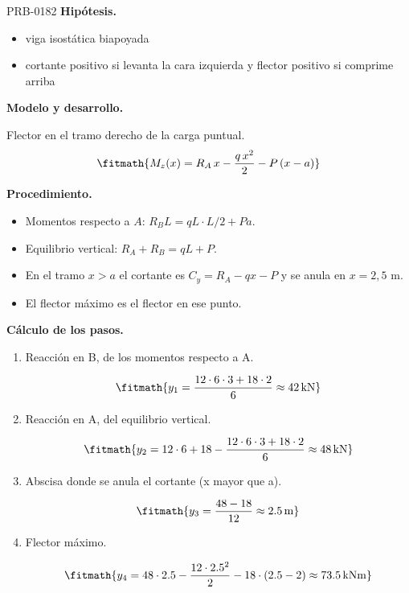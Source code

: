 \begin{studiumworked}{PRB-0182}
\textbf{Hipótesis.}\begin{itemize}\item viga isostática biapoyada
\item cortante positivo si levanta la cara izquierda y flector positivo si comprime arriba\end{itemize}

\textbf{Modelo y desarrollo.}

Flector en el tramo derecho de la carga puntual.\[\fitmath{M_z(x) = R_A\,x - \frac{q\,x^{2}}{2} - P\,(x - a)}\]

\textbf{Procedimiento.}\begin{itemize}\item Momentos respecto a $A$: $R_B L = qL\cdot L/2 + P a$.
\item Equilibrio vertical: $R_A + R_B = qL + P$.
\item En el tramo $x > a$ el cortante es $C_y = R_A - qx - P$ y se anula en $x = 2{,}5$ m.
\item El flector máximo es el flector en ese punto.\end{itemize}

\textbf{Cálculo de los pasos.}

\begin{enumerate}

\item Reacción en B, de los momentos respecto a A.

\[\fitmath{y_{1}=\frac{12\cdot 6\cdot 3+18\cdot 2}{6}\approx 42\,\mathrm{kN}}\]

\item Reacción en A, del equilibrio vertical.

\[\fitmath{y_{2}=12\cdot 6+18-\frac{12\cdot 6\cdot 3+18\cdot 2}{6}\approx 48\,\mathrm{kN}}\]

\item Abscisa donde se anula el cortante (x mayor que a).

\[\fitmath{y_{3}=\frac{48-18}{12}\approx 2.5\,\mathrm{m}}\]

\item Flector máximo.

\[\fitmath{y_{4}=48\cdot 2.5-\frac{12\cdot {2.5}^{2}}{2}-18\cdot \left(2.5-2\right)\approx 73.5\,\mathrm{kN m}}\]

\end{enumerate}


\end{studiumworked}
